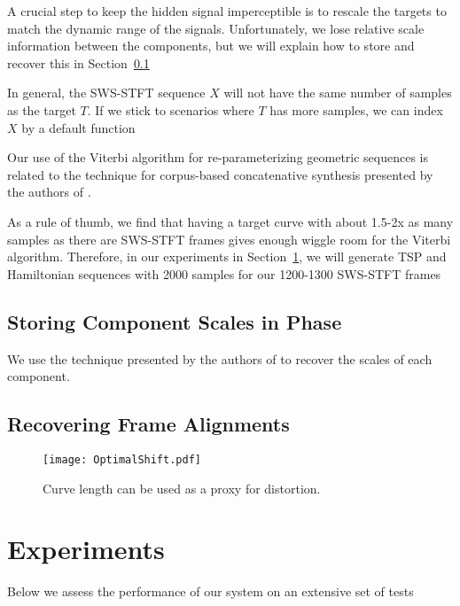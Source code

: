 \documentclass[runningheads]{llncs}
\begin{document}
A crucial step to keep the hidden signal imperceptible is to rescale the targets to match the dynamic range of the signals.  Unfortunately, we lose relative scale information between the components, but we will explain how to store and recover this in Section~\ref{sec:componentscales}


In general, the SWS-STFT sequence $X$ will not have the same number of samples as the target $T$.  If we stick to scenarios where $T$ has more samples, we can index $X$ by a default function 



Our use of the Viterbi algorithm for re-parameterizing geometric sequences is related to the technique for corpus-based concatenative synthesis presented by the authors of \cite{schwarz2007corpus}.


As a rule of thumb, we find that having a target curve with about 1.5-2x as many samples as there are SWS-STFT frames gives enough wiggle room for the Viterbi algorithm.  Therefore, in our experiments in Section~\ref{sec:experiments}, we will generate TSP and Hamiltonian sequences with 2000 samples for our 1200-1300 SWS-STFT frames

\subsection{Storing Component Scales in Phase}
\label{sec:componentscales}

We use the technique presented by the authors of \cite{xiaoxiao_dong_data_2004} to recover the scales of each component.

\subsection{Recovering Frame Alignments}


\begin{figure}
  \centering
  \texttt{[image: OptimalShift.pdf]}
  \caption{Curve length can be used as a proxy for distortion.}
  \label{fig:TSPTour}
\end{figure}



\section{Experiments}
\label{sec:experiments}

Below we assess the performance of our system on an extensive set of tests
\end{document}
